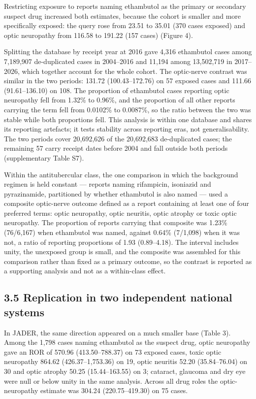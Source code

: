 \documentclass[12pt,a4paper]{article}
\begin{document}
Restricting exposure to reports naming ethambutol as the primary or secondary suspect drug increased both estimates, because the cohort is smaller and more specifically exposed: the query rose from 23.51 to 35.01 (370 cases exposed) and optic neuropathy from 116.58 to 191.22 (157 cases) (Figure 4).

Splitting the database by receipt year at 2016 gave 4,316 ethambutol cases among 7,189,907 de-duplicated cases in 2004–2016 and 11,194 among 13,502,719 in 2017–2026, which together account for the whole cohort. The optic-nerve contrast was similar in the two periods: 131.72 (100.43–172.76) on 57 exposed cases and 111.66 (91.61–136.10) on 108. The proportion of ethambutol cases reporting optic neuropathy fell from 1.32\% to 0.96\%, and the proportion of all other reports carrying the term fell from 0.0102\% to 0.0087\%, so the ratio between the two was stable while both proportions fell. This analysis is within one database and shares its reporting artefacts; it tests stability across reporting eras, not generalisability. The two periods cover 20,692,626 of the 20,692,683 de-duplicated cases; the remaining 57 carry receipt dates before 2004 and fall outside both periods (supplementary Table S7).

Within the antitubercular class, the one comparison in which the background regimen is held constant — reports naming rifampicin, isoniazid and pyrazinamide, partitioned by whether ethambutol is also named — used a composite optic-nerve outcome defined as a report containing at least one of four preferred terms: optic neuropathy, optic neuritis, optic atrophy or toxic optic neuropathy. The proportion of reports carrying that composite was 1.23\% (76/6,167) when ethambutol was named, against 0.64\% (7/1,098) when it was not, a ratio of reporting proportions of 1.93 (0.89–4.18). The interval includes unity, the unexposed group is small, and the composite was assembled for this comparison rather than fixed as a primary outcome, so the contrast is reported as a supporting analysis and not as a within-class effect.

\subsection*{3.5 Replication in two independent national systems}

In JADER, the same direction appeared on a much smaller base (Table 3). Among the 1,798 cases naming ethambutol as the suspect drug, optic neuropathy gave an ROR of 570.96 (413.50–788.37) on 73 exposed cases, toxic optic neuropathy 864.62 (426.37–1,753.36) on 19, optic neuritis 52.20 (35.84–76.04) on 30 and optic atrophy 50.25 (15.44–163.55) on 3; cataract, glaucoma and dry eye were null or below unity in the same analysis. Across all drug roles the optic-neuropathy estimate was 304.24 (220.75–419.30) on 75 cases.
\end{document}

